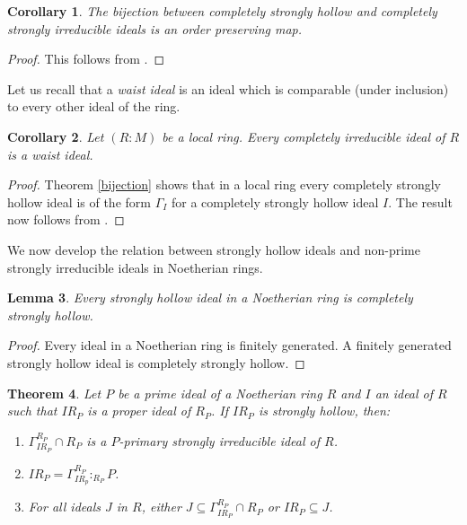 \documentclass[11pt,english]{amsart}
\newtheorem{theorem}{Theorem}[section]
\newtheorem{lemma}[theorem]{Lemma}
\newtheorem{corollary}[theorem]{Corollary}
\theoremstyle{definition}
\numberwithin{equation}{section}
\theoremstyle{remark}
\begin{document}
\begin{corollary}
    The bijection between completely strongly hollow and completely strongly irreducible ideals is an order preserving map. 
\end{corollary}
\begin{proof}
    This follows  from \cite[Corollary.~1.16]{Rostami2021}.
\end{proof}

Let us recall that a \emph{waist ideal} is an ideal which is comparable (under inclusion) to every other ideal of the ring. 

\begin{corollary}
    Let $(R:M)$ be a local ring. Every completely irreducible ideal of $R$ is a waist ideal.
\end{corollary}

\begin{proof}
    Theorem \ref{bijection} shows that in a local ring every completely strongly hollow ideal is of the form $\Gamma_I$ for a completely strongly hollow ideal $I$. The result now follows from \cite[Theorem.~2.5]{Rostami2021}.
\end{proof}

We now develop the relation between strongly hollow ideals and non-prime strongly irreducible ideals in Noetherian rings.
\begin{lemma}\label{cs_noeth}
    Every strongly hollow ideal in a Noetherian ring is completely strongly hollow.
\end{lemma}
\begin{proof}
    Every ideal in a Noetherian ring is finitely generated. A finitely generated strongly hollow ideal is completely strongly hollow. 
\end{proof}

\begin{theorem}
    Let $P$ be a prime ideal of a Noetherian ring $R$ and $I$ an ideal of $R$ such that $IR_P$ is a proper ideal of $R_P$. If $IR_P$ is strongly hollow, then:
    \begin{enumerate}
        \item $\Gamma_{IR_P}^{R_P}\cap R_P$ is a $P$-primary strongly irreducible ideal of $R$.
        
        \item $IR_P=\Gamma_{IR_p}^{R_P}:_{R_P}P$.
        
        \item For all ideals $J$ in $R$, either $J\subseteq \Gamma_{IR_P}^{R_P}\cap R_P$ or $IR_P\subseteq J$.
    \end{enumerate}
\end{theorem}
\end{document}
